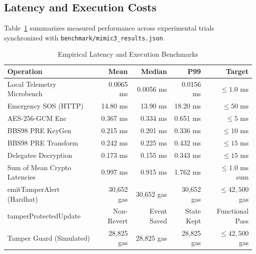 \documentclass[journal,10pt,twocolumn]{IEEEtran}
\begin{document}
\subsection{Latency and Execution Costs}
Table~\ref{tab:benchmarks} summarizes measured performance across experimental trials synchronized with \texttt{benchmark/mimic3\_results.json}.

\begin{table}[h]
\caption{Empirical Latency and Execution Benchmarks}
\label{tab:benchmarks}
\centering
\begin{tabular}{lrrrr}
\toprule
\textbf{Operation} & \textbf{Mean} & \textbf{Median} & \textbf{P99} & \textbf{Target} \\
\midrule
Local Telemetry Microbench & 0.0065 ms & 0.0056 ms & 0.0156 ms & $\le 1.0$ ms \\
Emergency SOS (HTTP)       & 14.80 ms  & 13.90 ms  & 18.20 ms  & $\le 50$ ms \\
AES-256-GCM Enc            & 0.367 ms  & 0.334 ms  & 0.651 ms  & $\le 5$ ms \\
BBS98 PRE KeyGen           & 0.215 ms  & 0.201 ms  & 0.336 ms  & $\le 10$ ms \\
BBS98 PRE Transform        & 0.242 ms  & 0.225 ms  & 0.432 ms  & $\le 15$ ms \\
Delegatee Decryption       & 0.173 ms  & 0.155 ms  & 0.343 ms  & $\le 15$ ms \\
Sum of Mean Crypto Latencies & 0.997 ms  & 0.915 ms  & 1.762 ms  & $\le 1.0$ ms sum \\
emitTamperAlert (Hardhat)  & 30,652 gas & 30,652 gas & 30,652 gas & $\le 42,500$ gas \\
tamperProtectedUpdate      & Non-Revert & Event Saved & State Kept & Functional Pass \\
Tamper Guard (Simulated)   & 28,825 gas & 28,825 gas & 28,825 gas & $\le 42,500$ gas \\
\bottomrule
\end{tabular}
\end{table}
\end{document}
